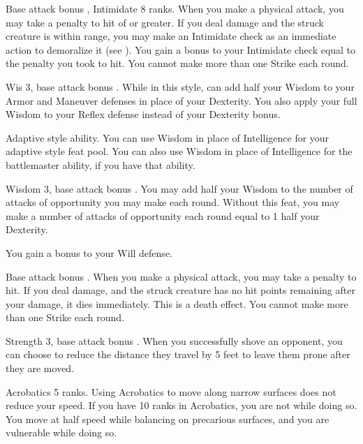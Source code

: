 \featpres Base attack bonus , Intimidate 8 ranks.
\featben When you make a physical attack, you may take a penalty to hit of  or greater. If you deal damage and the struck creature is within \rngmed range, you may make an Intimidate check as an immediate action to demoralize it (see ). You gain a bonus to your Intimidate check equal to the penalty you took to hit. You cannot make more than one Strike each round.

\featpre Wis 3, base attack bonus .
\featben While in this style, can add half your Wisdom to your Armor and Maneuver defenses in place of your Dexterity. You also apply your full Wisdom to your Reflex defense instead of your Dexterity bonus. 

\featpre Adaptive style ability.
\featben You can use Wisdom in place of Intelligence for your adaptive style feat pool. You can also use Wisdom in place of Intelligence for the battlemaster ability, if you have that ability.

\featpres Wisdom 3, base attack bonus .
\featben You may add half your Wisdom to the number of attacks of opportunity you may make each round.
 Without this feat, you may make a number of attacks of opportunity each round equal to 1 \add half your Dexterity.

 You gain a  bonus to your Will defense.

\featpre Base attack bonus .
\featben When you make a physical attack, you may take a  penalty to hit. If you deal damage, and the struck creature has no hit points remaining after your damage, it dies immediately. This is a death effect. You cannot make more than one Strike each round.

\featpres Strength 3, base attack bonus .
\featben When you successfully shove an opponent, you can choose to reduce the distance they travel by 5 feet to leave them prone after they are moved.

\featpre Acrobatics 5 ranks.
\featben Using Acrobatics to move along narrow surfaces does not reduce your speed. If you have 10 ranks in Acrobatics, you are not \vulnerable while doing so.
 You move at half speed while balancing on precarious surfaces, and you are vulnerable while doing so.

